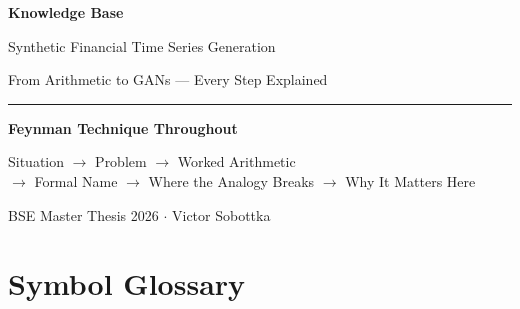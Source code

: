 \documentclass[11pt,openany]{book}
\theoremstyle{definition}
\theoremstyle{remark}
\begin{document}
\frontmatter
\begin{titlepage}
\pagecolor{Navy}\color{white}
\vspace*{3cm}
\begin{center}
{\fontsize{28}{34}\bfseries Knowledge Base\par}
\vspace{0.5cm}
{\Large Synthetic Financial Time Series Generation\par}
\vspace{0.3cm}
{\large From Arithmetic to GANs --- Every Step Explained\par}
\vspace{1.5cm}
\textcolor{blue!40!white}{\rule{0.5\textwidth}{0.5pt}}
\vspace{1cm}

{\large\bfseries Feynman Technique Throughout\par}
\vspace{0.5cm}
{\normalsize
  Situation $\to$ Problem $\to$ Worked Arithmetic\\
  $\to$ Formal Name $\to$ Where the Analogy Breaks $\to$ Why It Matters Here
\par}
\vspace{1.5cm}
{\normalsize BSE Master Thesis 2026 $\cdot$ Victor Sobottka\par}
\end{center}
\end{titlepage}

\pagecolor{white}\color{black}
\tableofcontents
\clearpage

\mainmatter




















\backmatter

\chapter*{Symbol Glossary}
\end{document}
